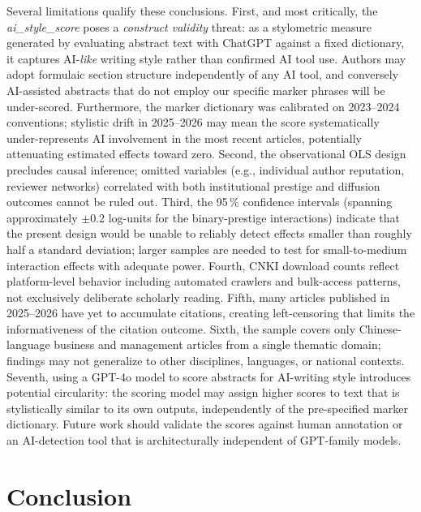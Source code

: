 \documentclass[12pt,a4paper]{article}
\begin{document}
Several limitations qualify these conclusions.
First, and most critically, the \textit{ai\_style\_score} poses a
\textit{construct validity} threat: as a stylometric measure generated
by evaluating abstract text with ChatGPT against a fixed dictionary,
it captures AI-\textit{like} writing style rather than confirmed
AI tool use.
Authors may adopt formulaic section structure independently of any AI
tool, and conversely AI-assisted abstracts that do not employ
our specific marker phrases will be under-scored.
Furthermore, the marker dictionary was calibrated on 2023--2024
conventions; stylistic drift in 2025--2026 may mean the score
systematically under-represents AI involvement in the most recent
articles, potentially attenuating estimated effects toward zero.
Second, the observational OLS design precludes causal inference;
omitted variables (e.g., individual author reputation, reviewer networks)
correlated with both institutional prestige and diffusion outcomes
cannot be ruled out.
Third, the 95\,\% confidence intervals (spanning approximately
$\pm$0.2 log-units for the binary-prestige interactions) indicate that
the present design would be unable to reliably detect effects smaller
than roughly half a standard deviation; larger samples are needed to
test for small-to-medium interaction effects with adequate power.
Fourth, CNKI download counts reflect platform-level behavior including
automated crawlers and bulk-access patterns, not exclusively deliberate
scholarly reading.
Fifth, many articles published in 2025--2026 have yet to accumulate
citations, creating left-censoring that limits the informativeness of
the citation outcome.
Sixth, the sample covers only Chinese-language business and management
articles from a single thematic domain; findings may not generalize
to other disciplines, languages, or national contexts.
Seventh, using a GPT-4o model to score abstracts for AI-writing style
introduces potential circularity: the scoring model may assign higher
scores to text that is stylistically similar to its own outputs,
independently of the pre-specified marker dictionary.
Future work should validate the scores against human annotation or
an AI-detection tool that is architecturally independent of GPT-family
models.

\section{Conclusion}
\label{sec:conclusion}
\end{document}
